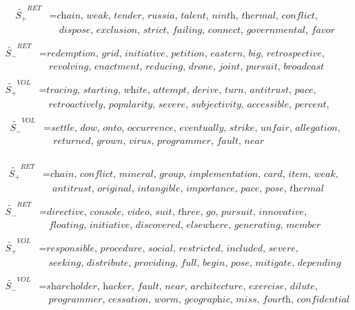 \documentclass[logo,bsc,singlespacing,parskip]{infthesis}
\begin{document}
\begin{align*}
\tilde{S_{+}}^{RET} &= \textit{chain, weak, tender, russia, talent, ninth, thermal, conflict, } \\
               &\quad \textit{dispose, exclusion, strict, failing, connect, governmental, favor} \\
\end{align*}
\begin{align*}
\tilde{S_{-}}^{RET} &= \textit{redemption, grid, initiative, petition, eastern, big, retrospective, branded, } \\
               &\quad \textit{revolving, enactment, reducing, drone, joint, pursuit, broadcast} \\
\end{align*}
\begin{align*}
\tilde{S_{+}}^{VOL} &= \textit{tracing, starting, white, attempt, derive, turn, antitrust, pace, } \\
               &\quad \textit{retroactively, popularity, severe, subjectivity, accessible, percent, travel} \\
\end{align*}
\begin{align*}
\tilde{S_{-}}^{VOL} &= \textit{settle, dow, onto, occurrence, eventually, strike, unfair, allegation,} \\
               &\quad \textit{returned, grown, virus, programmer, fault, near} \\
\end{align*}



\begin{align*}
\tilde{S_{+}}^{RET} &= \textit{chain, conflict, mineral, group, implementation, card, item, weak, } \\
               &\quad \textit{antitrust, original, intangible, importance, pace, pose, thermal} \\
\end{align*}
\begin{align*}
\tilde{S_{-}}^{RET} &= \textit{directive, console, video, suit, three, go, pursuit, innovative, interested,} \\
               &\quad \textit{floating, initiative, discovered, elsewhere, generating, member} \\
\end{align*}
\begin{align*}
\tilde{S_{+}}^{VOL} &= \textit{responsible, procedure, social, restricted, included, severe, forecasting, } \\
               &\quad \textit{seeking, distribute, providing, full, begin, pose, mitigate, depending} \\
\end{align*}
\begin{align*}
\tilde{S_{-}}^{VOL} &= \textit{shareholder, hacker, fault, near, architecture, exercise, dilute, occurrence,} \\
               &\quad \textit{programmer, cessation, worm, geographic, miss, fourth, confidential} \\
\end{align*}
\end{document}
